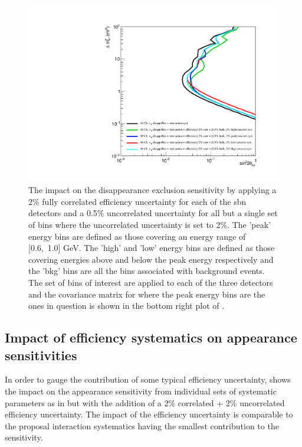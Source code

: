 \begin{figure}[!h]
    \centering
    \includegraphics[width = \largefigwidth]{figures-chap6/exclusion_contours/efficiency_systematics/numu_disapp_2pct_cor_05pct_bulk_2pct_X_uncor.pdf}
    \caption[\numu disapp with poorly constrained efficiency systematic for a set of bins.]{The impact on the \numu disappearance exclusion sensitivity by applying a 2\% fully correlated efficiency uncertainty for each of the \gls{sbn} detectors and a 0.5\% uncorrelated uncertainty for all but a single set of bins where the uncorrelated uncertainty is set to 2\%. The 'peak' energy bins are defined as those covering an energy range of [0.6,~1.0] GeV. The 'high' and 'low' energy bins are defined as those covering energies above and below the peak energy respectively and the 'bkg' bins are all the bins associated with background events. The set of bins of interest are applied to each of the three detectors and the covariance matrix for where the peak energy bins are the ones in question is shown in the bottom right plot of .}
    \label{fig:numu_bulk_uncorr}
\end{figure}


\clearpage
\subsection{\texorpdfstring{Impact of efficiency systematics on \nue appearance sensitivities}{Impact of efficiency systematics on nue appearance sensitivities}}

In order to gauge the contribution of some typical efficiency uncertainty,  shows the impact on the \nue appearance sensitivity from individual sets of systematic parameters as in  but with the addition of a 2\% correlated + 2\% uncorrelated efficiency uncertainty. The impact of the efficiency uncertainty is comparable to the proposal interaction systematics having the smallest contribution to the sensitivity. 

